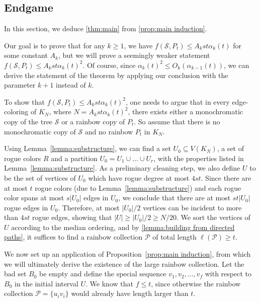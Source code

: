 \documentclass[a4paper,11pt]{article}
\makeatletter
\renewenvironment{proof}[1][\proofname] {\par\pushQED{\qed}\normalfont\topsep6\p@\@plus6\p@\relax\trivlist\item[\hskip\labelsep\bfseries#1\@addpunct{.}]\ignorespaces}{\popQED\endtrivlist\@endpefalse}
\theoremstyle{definition}
\def\cP{\mathcal{P}}
\def\cS{\mathcal{S}}
\makeatother
\begin{document}
\subsection{Endgame}

In this section, we deduce \cref{thm:main} from \cref{prop:main induction}.

\begin{proof}[Proof of Theorem~\ref{thm:main}.]
Our goal is to prove that for any $k\geq 1$, we have $f(\cS, P_t)\leq A_k st\alpha_k(t)$ for some constant $A_k$, but we will prove a seemingly weaker statement $f(\cS, P_t)\leq A_k st\alpha_k(t)^2$. Of course, since $\alpha_k(t)^2\leq O_k(\alpha_{k-1}(t))$, we can derive the statement of the theorem by applying our conclusion with the parameter $k+1$ instead of $k$.

To show that $f(\cS, P_t)\leq A_k st\alpha_k(t)^2$, one needs to argue that in every edge-coloring of $K_N$, where $N= A_k st\alpha_k(t)^2$, there exists either a monochromatic copy of the tree $\cS$ or a rainbow copy of $P_t$. So assume that there is no monochromatic copy of $\cS$ and no rainbow $P_t$ in $K_N$.

Using Lemma~\ref{lemma:substructure}, we can find a set $U_0\subseteq V(K_N)$, a set of rogue colors $R$ and a partition $U_0=U_1\cup\dots\cup U_r$, with the properties listed in Lemma~\ref{lemma:substructure}. As a preliminary cleaning step, we also define $U$ to be the set of vertices of $U_0$ which have rogue degree at most $4st$. Since there are at most $t$ rogue colors (due to Lemma~\ref{lemma:substructure}) and each rogue color spans at most $s|U_0|$ edges in $U_0$, we conclude that there are at most $st|U_0|$ rogue edges in $U_0$. Therefore, at most $|U_0|/2$ vertices can be incident to more than $4st$ rogue edges, showing that $|U|\geq |U_0|/2\geq N/20$.
We sort the vertices of $U$ according to the median ordering, and by \cref{lemma:building from directed paths}, it suffices to find a rainbow collection $\cP$
of total length $\ell(\cP)\geq t$.

We now set up an application of Proposition~\ref{prop:main induction}, from which we will ultimately derive the existence of the large rainbow collection. Let the bad set $B_0$ be empty and define the special sequence $v_1, v_2, \dots, v_f$ with respect to $B_0$ in the initial interval $U$. We know that $f\leq t$, since otherwise the rainbow collection $\cP=\{u_iv_i\}$ would already have length larger than $t$. 


\end{proof}
\end{document}
